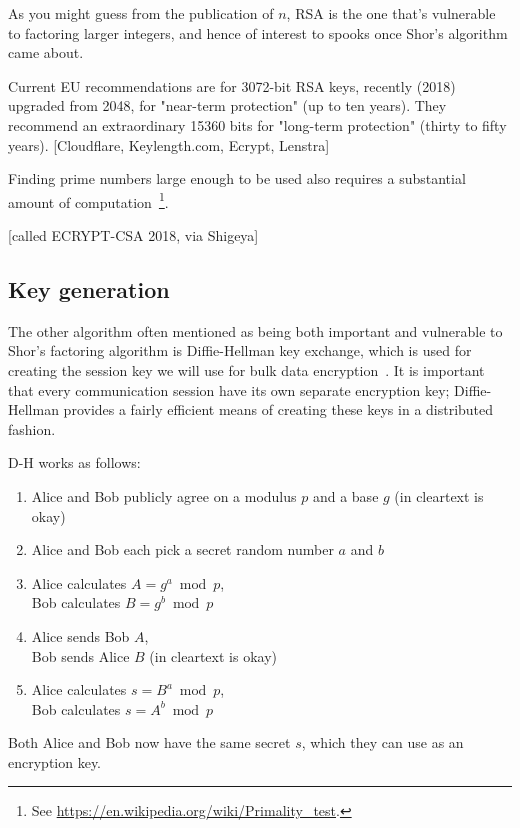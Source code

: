 As you might guess from the publication of $n$, RSA is the one that's
vulnerable to factoring larger integers, and hence of interest to
spooks once Shor's algorithm came about.

Current EU recommendations are for 3072-bit RSA keys, recently (2018)
upgraded from 2048, for "near-term protection" (up to ten years).
They recommend an extraordinary 15360 bits for "long-term protection"
(thirty to fifty years). [Cloudflare, Keylength.com, Ecrypt, Lenstra]

Finding prime numbers large enough to be used also requires a
substantial amount of computation~\footnote{See
  \url{https://en.wikipedia.org/wiki/Primality_test}.}.

[called ECRYPT-CSA 2018, via Shigeya]

\subsection{Key generation}

The other algorithm often mentioned as being both important and
vulnerable to Shor's factoring algorithm is Diffie-Hellman key
exchange, which is used for creating the session key we will use for
bulk data encryption~\cite{diffie1976new}.  It is important that every
communication session have its own separate encryption key;
Diffie-Hellman provides a fairly efficient means of creating these
keys in a distributed fashion.

D-H works as follows:

\begin{enumerate}
  \item Alice and Bob publicly agree on a modulus $p$ and a base $g$ (in cleartext is okay)
  \item Alice and Bob each pick a secret random number $a$ and $b$
  \item Alice calculates $A = g^a \bmod p$, \\
    Bob calculates $B = g^b \bmod p$
  \item Alice sends Bob $A$, \\
Bob sends Alice $B$ (in cleartext is okay)
  \item Alice calculates $s = B^a \bmod p$, \\
	   Bob calculates $s = A^b \bmod p$
\end{enumerate}

Both Alice and Bob now have the same secret $s$, which they can use as
an encryption key.

